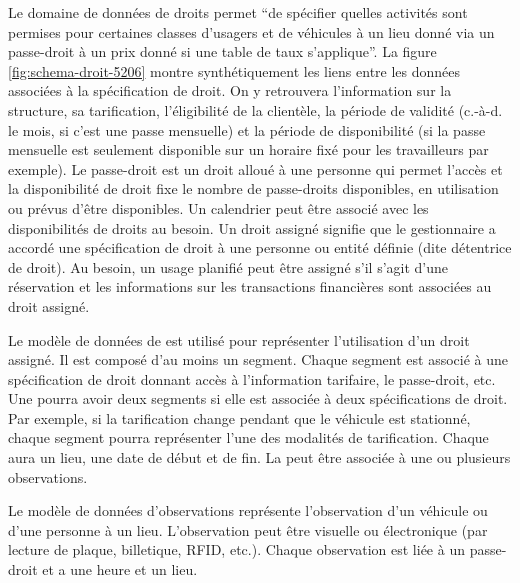     Le domaine de données de droits permet \enquote{de spécifier quelles activités sont permises pour certaines classes d'usagers et de véhicules à un lieu donné via un passe-droit à un prix donné si une table de taux s'applique}. La figure \ref{fig:schema-droit-5206} montre synthétiquement les liens entre les données associées à la spécification de droit. On y retrouvera l'information sur la structure, sa tarification, l'éligibilité de la clientèle, la période de validité (c.-à-d. le mois, si c'est une passe mensuelle) et la période de disponibilité (si la passe mensuelle est seulement disponible sur un horaire fixé pour les travailleurs par exemple). Le passe-droit est un droit alloué à une personne qui permet l'accès et la disponibilité de droit fixe le nombre de passe-droits disponibles, en utilisation ou prévus d'être disponibles. Un calendrier peut être associé avec les disponibilités de droits au besoin. Un droit assigné signifie que le gestionnaire a accordé une spécification de droit à une personne ou entité définie (dite détentrice de droit). Au besoin, un usage planifié peut être assigné s'il s'agit d'une réservation et les informations sur les transactions financières sont associées au droit assigné. \par
    Le modèle de données de \fg{} est utilisé pour représenter l'utilisation d'un droit assigné. Il est composé d'au moins un segment. Chaque segment est associé à une spécification de droit donnant accès à l'information tarifaire, le passe-droit, etc.  Une \fg{}  pourra avoir deux segments si elle est associée à deux spécifications de droit. Par exemple, si la tarification change pendant que le véhicule est stationné, chaque segment pourra représenter l'une des modalités de tarification. Chaque \fg{}  aura un lieu, une date de début et de fin. La \fg{}  peut être associée à une ou plusieurs observations.\par
    Le modèle de données d'observations représente l'observation d'un véhicule ou d'une personne à un lieu. L'observation peut être visuelle ou électronique (par lecture de plaque, billetique, RFID, etc.). Chaque observation est liée à un passe-droit et a une heure et un lieu.\par
